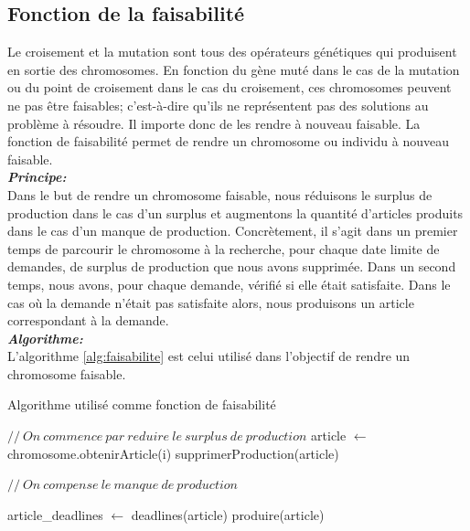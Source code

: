 	\subsection{Fonction de la faisabilité}
	Le croisement et la mutation sont tous des opérateurs génétiques qui produisent en sortie des chromosomes. En fonction du gène muté dans le cas de la mutation ou du point de croisement dans le cas du croisement, ces chromosomes peuvent ne pas être faisables; c'est-à-dire qu'ils ne représentent pas des solutions au problème à résoudre. Il importe donc de les rendre à nouveau faisable. La fonction de faisabilité permet de rendre un chromosome ou individu à nouveau faisable. \\
	
	\hspace*{.5cm} \textbf{\textsl{Principe:}}\\	
	\hspace*{.5cm} Dans le but de rendre un chromosome faisable, nous  réduisons le surplus de production dans le cas d'un surplus et augmentons la quantité d'articles produits dans le cas d'un manque de production. Concrètement, il s'agit dans un premier temps de parcourir le chromosome à la recherche, pour chaque date limite de demandes, de surplus de production que nous avons supprimée. Dans un second temps, nous avons, pour chaque demande, vérifié si elle était satisfaite. Dans le cas où la demande n'était pas satisfaite alors, nous produisons un article correspondant à la demande. \\
	
	\hspace*{.5cm} \textbf{\textsl{Algorithme:}}\\	
	\hspace*{.5cm} L'algorithme \ref{alg:faisabilite} est celui utilisé dans l'objectif de rendre un chromosome faisable.
	\\
	\begin{algorithm}[H]
 		\caption{Algorithme utilisé comme fonction de faisabilité}
 		\label{alg:faisabilite}
 		\BlankLine
 		$//\ On\ commence\ par\ reduire\ le\ surplus\ de\ production$ \;
 		{
 			article $\gets$ chromosome.obtenirArticle(i) \;
 			{
 				supprimerProduction(article) \;
 			}
 		}
 		
 		$ //\ On\ compense\ le\ manque\ de\ production $ \;
 		
 		{
 			article\_deadlines $\gets$ deadlines(article) \;
 			{
 				{
 					produire(article)\;
 				}
 			}
 		}
 	
	\end{algorithm}
	
